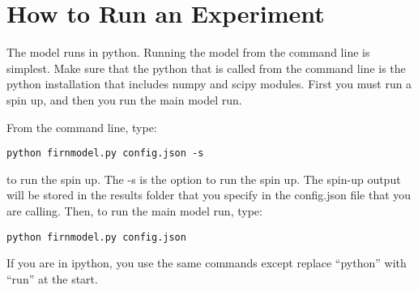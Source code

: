 \documentclass{article}
\begin{document}
\section{How to Run an Experiment}

The model runs in python. Running the model from the command line is simplest. Make sure that the python that is called from the command line is the python installation that includes numpy and scipy modules. First you must run a spin up, and then you run the main model run. 

From the command line, type:

\begin{verbatim}
python firnmodel.py config.json -s
\end{verbatim}

to run the spin up. The -s is the option to run the spin up. The spin-up output will be stored in the results folder that you specify in the config.json file that you are calling. Then, to run the main model run, type:

\begin{verbatim}
python firnmodel.py config.json
\end{verbatim}

If you are in ipython, you use the same commands except replace ``python'' with ``run'' at the start. 
\end{document}
